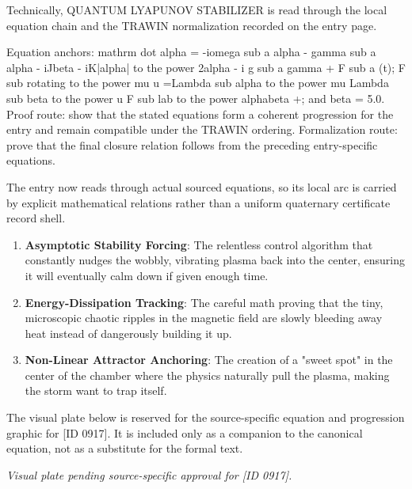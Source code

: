 Technically, QUANTUM LYAPUNOV STABILIZER is read through the local equation chain and the TRAWIN normalization recorded on the entry page.

Equation anchors: mathrm dot alpha = -iomega sub a alpha - gamma sub a alpha - iJbeta - iK|alpha| to the power 2alpha - i g sub a gamma + F sub a (t); F sub rotating to the power mu u =Lambda sub alpha to the power mu Lambda sub beta to the power u F sub lab to the power alphabeta +; and beta = 5.0. Proof route: show that the stated equations form a coherent progression for the entry and remain compatible under the TRAWIN ordering. Formalization route: prove that the final closure relation follows from the preceding entry-specific equations.

The entry now reads through actual sourced equations, so its local arc is carried by explicit mathematical relations rather than a uniform quaternary certificate record shell.
\endgroup

\begin{enumerate}[leftmargin=1.6em,itemsep=6pt,topsep=4pt]
\item \textbf{Asymptotic Stability Forcing}: The relentless control algorithm that constantly nudges the wobbly, vibrating plasma back into the center, ensuring it will eventually calm down if given enough time.
\item \textbf{Energy-Dissipation Tracking}: The careful math proving that the tiny, microscopic chaotic ripples in the magnetic field are slowly bleeding away heat instead of dangerously building it up.
\item \textbf{Non-Linear Attractor Anchoring}: The creation of a "sweet spot" in the center of the chamber where the physics naturally pull the plasma, making the storm want to trap itself.
\end{enumerate}

\begingroup\footnotesize\sloppy
The visual plate below is reserved for the source-specific equation and progression graphic for [ID 0917]. It is included only as a companion to the canonical equation, not as a substitute for the formal text.
\par\endgroup
\begingroup\footnotesize\itshape
Visual plate pending source-specific approval for [ID 0917].
\par\endgroup

